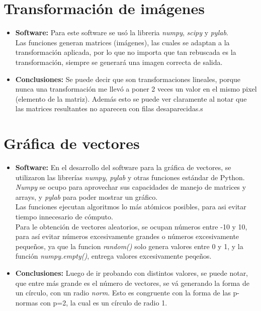 \documentclass[12pt,letterpaper]{article}
\begin{document}
\section{Transformación de imágenes}
\begin{itemize}
\item \textbf{Software:} Para este software se usó la libreria \textit{numpy}, \textit{scipy} y \textit{pylab}.\\
Las funciones generan matrices (imágenes), las cuales se adaptan a la transformación aplicada, por lo que no importa que tan rebuscada es la transformación, siempre se generará una imagen correcta de salida.
\item \textbf{Conclusiones:} Se puede decir que son transformaciones lineales, porque nunca una transformación me llevó a poner 2 veces un valor en el mismo pixel (elemento de la matriz). Además esto se puede ver claramente al notar que las matrices resultantes no aparecen con filas desaparecidas.s
\end{itemize}

\section{Gráfica de vectores}
\begin{itemize}
\item \textbf{Software:} En el desarrollo del software para la gráfica de vectores, se utilizaron las librerías \textit{numpy}, \textit{pylab} y otras funciones estándar de Python. \textit{Numpy} se ocupo para aprovechar sus capacidades de manejo de matrices y arrays, y \textit{pylab} para poder mostrar un gráfico.\\
Las funciones ejecutan algoritmos lo más atómicos posibles, para asi evitar tiempo innecesario de cómputo.\\
Para le obtención de vectores aleatorios, se ocupan números entre -10 y 10, para así evitar números excesivamente grandes o números excesivamente pequeños, ya que la funcion \textit{random()} solo genera valores entre 0 y 1, y la función \textit{numpy.empty()}, entrega valores excesivamente peqeños.
\item \textbf{Conclusiones:} Luego de ir probando con distintos valores, se puede notar, que entre más grande es el número de vectores, se vá generando la forma de un círculo, con un radio \textit{norm}. Esto es congruente con la forma de las p-normas con p=2, la cual es un círculo de radio 1.\\

\end{itemize}
\end{document}

